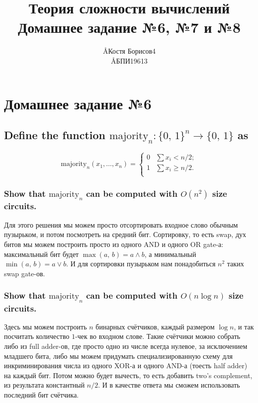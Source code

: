 \documentclass{article}
\title{Теория сложности вычислений \\ Домашнее задание №6, №7 и №8}
\author{\AA{Костя Борисов}{4} \\ \AA{БПИ196}{13}}
\begin{document}
  \maketitle

  \setcounter{section}{5}
  \section{Домашнее задание №6}
  \setcounter{subsection}{8}
  \subsection{Define the function $\mathrm{majority}_n: \{0,\, 1\}^n \to \{0,\, 1\}$ as}
  $$\mathrm{majority}_n(x_1,\dots,x_n) = \begin{cases}
    0 & \sum x_i < n/2;\\
    1 & \sum x_i \geq n/2.\\
  \end{cases}$$
  \subsubsection{Show that $\mathrm{majority}_n$ can be computed with $O(n^2)$ size circuits.}
  Для этого решения мы можем просто отсортировать входное слово обычным пузырьком, и потом посмотреть на средний бит.
  Сортировку, то есть swap, дух битов мы можем построить просто из одного AND и одного OR gate-а:
  максимальный бит будет $\max(a,\, b) = a \land b$, а минимальный $\min(a,\, b) = a \lor b$.
  И для сортировки пузырьком нам понадобиться $n^2$ таких swap gate-ов.

  \subsubsection{Show that $\mathrm{majority}_n$ can be computed with $O(n\log n)$ size circuits.}
  Здесь мы можем построить $n$ бинарных счётчиков, каждый размером $\log n$, и так посчитать количество $1$-чек во входном слове.
  Такие счётчики можно собрать либо из full adder-ов, где просто одно из числе всегда нулевое, за исключением младшего бита, либо мы можем придумать специализированную схему для инкриминирования числа из одного XOR-а и одного AND-а (тоесть half adder) на каждый бит.
  Потом можно будет вычесть, то есть добавить two's complement, из результата константный $n/2$.
  И в качестве ответа мы сможем использовать последний бит счётчика.
\end{document}

